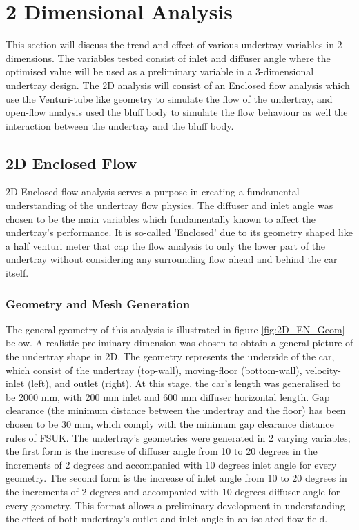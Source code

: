 
\section{2 Dimensional Analysis}
This section will discuss the trend and effect of various undertray variables in 2 dimensions. The variables tested consist of inlet and diffuser angle where the optimised value will be used as a preliminary variable in a 3-dimensional undertray design. The 2D analysis will consist of an Enclosed flow analysis which use the Venturi-tube like geometry to simulate the flow of the undertray, and open-flow analysis used the bluff body to simulate the flow behaviour as well the interaction between the undertray and the bluff body. 

\subsection{2D Enclosed Flow}
2D Enclosed flow analysis serves a purpose in creating a fundamental understanding of the undertray flow physics. The diffuser and inlet angle was chosen to be the main variables which fundamentally known to affect the undertray's performance. It is so-called 'Enclosed' due to its geometry shaped like a half venturi meter that cap the flow analysis to only the lower part of the undertray without considering any surrounding flow ahead and behind the car itself. 

\subsubsection{Geometry and Mesh Generation}
\noindent The general geometry of this analysis is illustrated in figure \ref{fig:2D_EN_Geom} below. A realistic preliminary dimension was chosen to obtain a general picture of the undertray shape in 2D. The geometry represents the underside of the car, which consist of the undertray (top-wall), moving-floor (bottom-wall), velocity-inlet (left), and outlet (right). At this stage, the car's length was generalised to be 2000 mm, with 200 mm inlet and 600 mm diffuser horizontal length. Gap clearance (the minimum distance between the undertray and the floor) has been chosen to be 30 mm, which comply with the minimum gap clearance distance rules of FSUK. The undertray's geometries were generated in 2 varying variables; the first form is the increase of diffuser angle from 10 to 20 degrees in the increments of 2 degrees and accompanied with 10 degrees inlet angle for every geometry. The second form is the increase of inlet angle from 10 to 20 degrees in the increments of 2 degrees and accompanied with 10 degrees diffuser angle for every geometry. This format allows a preliminary development in understanding the effect of both undertray's outlet and inlet angle in an isolated flow-field. 

